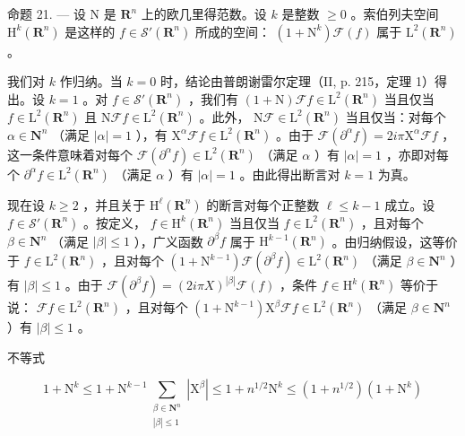 命题 21. --- 设 N 是 \(\mathbf{R}^{n}\) 上的欧几里得范数。设 \(k\) 是整数 \(\geqslant 0\) 。索伯列夫空间 \(\mathrm{H}^{k}(\mathbf{R}^{n})\) 是这样的 \(f \in \mathcal{S}'(\mathbf{R}^{n})\) 所成的空间： \((1 + \mathrm{N}^{k})\mathcal{F}(f)\) 属于 \(\mathrm{L}^{2}(\mathbf{R}^{n})\) 。

我们对 \(k\) 作归纳。当 \(k = 0\) 时，结论由普朗谢雷尔定理（II, p. 215，定理 1）得出。设 \(k = 1\) 。对 \(f \in \mathcal{S}'(\mathbf{R}^n)\) ，我们有 \((1 + \mathrm{N})\mathcal{F}f \in \mathrm{L}^2(\mathbf{R}^n)\) 当且仅当 \(f \in \mathrm{L}^2(\mathbf{R}^n)\) 且 \(\mathrm{N}\mathcal{F}f \in \mathrm{L}^2(\mathbf{R}^n)\) 。此外， \(\mathrm{N}\mathcal{F} \in \mathrm{L}^2(\mathbf{R}^n)\) 当且仅当：对每个 \(\alpha \in \mathbf{N}^n\) （满足 \(|\alpha| = 1\) ），有 \(\mathrm{X}^\alpha\mathcal{F}f \in \mathrm{L}^2(\mathbf{R}^n)\) 。由于 \(\mathcal{F}(\partial^\alpha f) = 2i\pi\mathrm{X}^\alpha\mathcal{F}f\) ，这一条件意味着对每个 \(\mathcal{F}(\partial^\alpha f) \in \mathrm{L}^2(\mathbf{R}^n)\) （满足 \(\alpha\) ）有 \(|\alpha| = 1\) ，亦即对每个 \(\partial^\alpha f \in \mathrm{L}^2(\mathbf{R}^n)\) （满足 \(\alpha\) ）有 \(|\alpha| = 1\) 。由此得出断言对 \(k = 1\) 为真。

现在设 \(k \geqslant 2\) ，并且关于 \(\mathrm{H}^{\ell}(\mathbf{R}^{n})\) 的断言对每个正整数 \(\ell \leqslant k - 1\) 成立。设 \(f \in \mathcal{S}'(\mathbf{R}^{n})\) 。按定义， \(f \in \mathrm{H}^{k}(\mathbf{R}^{n})\) 当且仅当 \(f \in \mathrm{L}^{2}(\mathbf{R}^{n})\) ，且对每个 \(\beta \in \mathbf{N}^{n}\) （满足 \(|\beta| \leqslant 1\) ），广义函数 \(\partial^{\beta} f\) 属于 \(\mathrm{H}^{k-1}(\mathbf{R}^{n})\) 。由归纳假设，这等价于 \(f \in \mathrm{L}^{2}(\mathbf{R}^{n})\) ，且对每个 \((1 + \mathrm{N}^{k-1})\mathcal{F}(\partial^{\beta} f) \in \mathrm{L}^{2}(\mathbf{R}^{n})\) （满足 \(\beta \in \mathbf{N}^{n}\) ）有 \(|\beta| \leqslant 1\) 。由于 \(\mathcal{F}(\partial^{\beta} f) = (2i\pi X)^{|\beta|}\mathcal{F}(f)\) ，条件 \(f \in \mathrm{H}^{k}(\mathbf{R}^{n})\) 等价于说： \(\mathcal{F}f \in \mathrm{L}^{2}(\mathbf{R}^{n})\) ，且对每个 \((1 + \mathrm{N}^{k-1})\mathrm{X}^{\beta}\mathcal{F}f \in \mathrm{L}^{2}(\mathbf{R}^{n})\) （满足 \(\beta \in \mathbf{N}^{n}\) ）有 \(|\beta| \leqslant 1\) 。

不等式

\[
1 + \mathrm{N}^{k}\leqslant 1 + \mathrm{N}^{k - 1}\sum_{\substack{\beta \in \mathbf{N}^{n}\\ |\beta |\leqslant 1}}|\mathrm{X}^{\beta}|\leqslant 1 + n^{1 / 2}\mathrm{N}^{k}\leqslant (1 + n^{1 / 2})(1 + \mathrm{N}^{k})
\]

